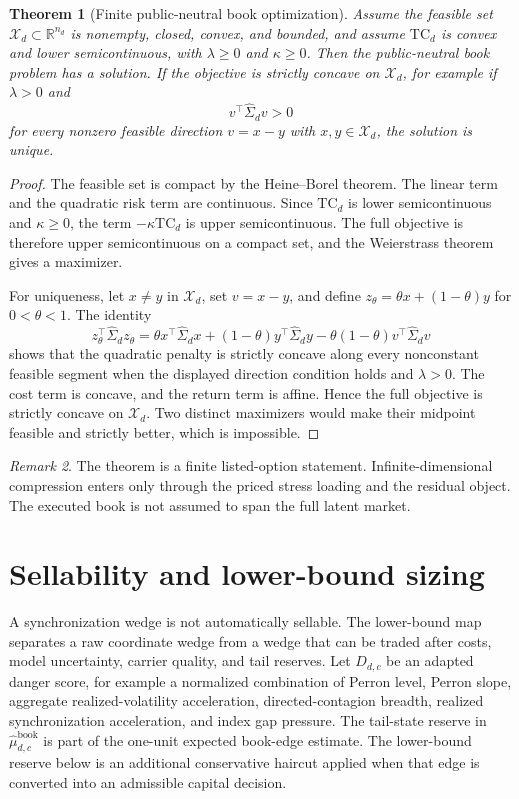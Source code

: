 \documentclass[11pt,a4paper]{amsart}
\theoremstyle{plain}
\newtheorem{theorem}{Theorem}[section]
\theoremstyle{definition}
\theoremstyle{remark}
\newtheorem{remark}[theorem]{Remark}
\newcommand{\R}{\mathbb{R}}
\newcommand{\cX}{\mathcal{X}}
\begin{document}
\begin{theorem}[Finite public-neutral book optimization]\label{thm:finite-book}
Assume the feasible set \(\cX_d\subset\R^{n_d}\) is nonempty, closed, convex, and bounded, and
assume \(\mathrm{TC}_d\) is convex and lower semicontinuous, with \(\lambda\ge0\) and
\(\kappa\ge0\).  Then the public-neutral book problem has a solution.  If the objective is
strictly concave on \(\cX_d\), for example if \(\lambda>0\) and
\[
        v^\top\widehat\Sigma_d v>0
\]
for every nonzero feasible direction \(v=x-y\) with \(x,y\in\cX_d\), the solution is unique.
\end{theorem}

\begin{proof}
The feasible set is compact by the Heine--Borel theorem.  The linear term and the quadratic risk
term are continuous.  Since \(\mathrm{TC}_d\) is lower semicontinuous and \(\kappa\ge0\), the term
\(-\kappa\mathrm{TC}_d\) is upper semicontinuous.  The full objective is therefore upper
semicontinuous on a compact set, and the Weierstrass theorem gives a maximizer.

For uniqueness, let \(x\ne y\) in \(\cX_d\), set \(v=x-y\), and define
\(z_\theta=\theta x+(1-\theta)y\) for \(0<\theta<1\).  The identity
\[
        z_\theta^\top\widehat\Sigma_d z_\theta
        =
        \theta x^\top\widehat\Sigma_d x
        +(1-\theta)y^\top\widehat\Sigma_d y
        -\theta(1-\theta)v^\top\widehat\Sigma_d v
\]
shows that the quadratic penalty is strictly concave along every nonconstant feasible segment
when the displayed direction condition holds and \(\lambda>0\).  The cost term is concave, and the
return term is affine.  Hence the full objective is strictly concave on \(\cX_d\).  Two distinct
maximizers would make their midpoint feasible and strictly better, which is impossible.
\end{proof}

\begin{remark}
The theorem is a finite listed-option statement.  Infinite-dimensional compression enters only
through the priced stress loading and the residual object.  The executed book is not assumed to
span the full latent market.
\end{remark}

\section{Sellability and lower-bound sizing}\label{sec:sellability}

A synchronization wedge is not automatically sellable.  The lower-bound map separates a raw
coordinate wedge from a wedge that can be traded after costs, model uncertainty, carrier quality,
and tail reserves.  Let \(D_{d,c}\) be an adapted danger score, for example a normalized
combination of Perron level, Perron slope, aggregate realized-volatility acceleration,
directed-contagion breadth, realized synchronization acceleration, and index gap pressure.  The
tail-state reserve in \(\widehat\mu_{d,c}^{\mathrm{book}}\) is part of the one-unit expected
book-edge estimate.  The lower-bound reserve below is an additional conservative haircut applied
when that edge is converted into an admissible capital decision.
\end{document}
